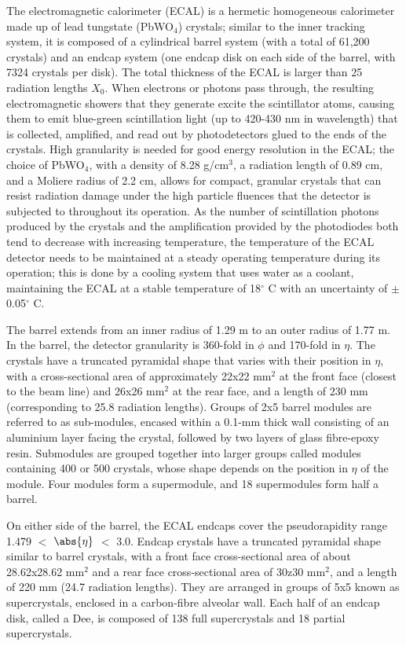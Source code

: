 The electromagnetic calorimeter (ECAL) is a hermetic homogeneous calorimeter made up of lead tungstate (PbWO$_4$) crystals; similar to the inner tracking system, it is composed of a cylindrical barrel system (with a total of 61,200 crystals) and an endcap system (one endcap disk on each side of the barrel, with 7324 crystals per disk). The total thickness of the ECAL is larger than 25 radiation lengths $X_0$. When electrons or photons pass through, the resulting electromagnetic showers that they generate excite the scintillator atoms, causing them to emit blue-green scintillation light (up to 420-430 nm in wavelength) that is collected, amplified, and read out by photodetectors glued to the ends of the crystals. High granularity is needed for good energy resolution in the ECAL; the choice of PbWO$_4$, with a density of 8.28 g/cm$^3$, a radiation length of 0.89 cm, and a Moliere radius of 2.2 cm, allows for compact, granular crystals that can resist radiation damage under the high particle fluences that the detector is subjected to throughout its operation. As the number of scintillation photons produced by the crystals and the amplification provided by the photodiodes both tend to decrease with increasing temperature, the temperature of the ECAL detector needs to be maintained at a steady operating temperature during its operation; this is done by a cooling system that uses water as a coolant, maintaining the ECAL at a stable temperature of 18$^{\circ}$ C with an uncertainty of $\pm$0.05$^{\circ}$ C.

The barrel extends from an inner radius of 1.29 m to an outer radius of 1.77 m. In the barrel, the detector granularity is 360-fold in $\phi$ and 170-fold in $\eta$. The crystals have a truncated pyramidal shape that varies with their position in $\eta$, with a cross-sectional area of approximately 22x22 mm$^2$ at the front face (closest to the beam line) and 26x26 mm$^2$ at the rear face, and a length of 230 mm (corresponding to 25.8 radiation lengths). Groups of 2x5 barrel modules are referred to as sub-modules, encased within a 0.1-mm thick wall consisting of an aluminium layer facing the crystal, followed by two layers of glass fibre-epoxy resin. Submodules are grouped together into larger groups called modules containing 400 or 500 crystals, whose shape depends on the position in $\eta$ of the module. Four modules form a supermodule, and 18 supermodules form half a barrel.

On either side of the barrel, the ECAL endcaps cover the pseudorapidity range 1.479 $<$ $\abs{\eta}$ $<$ 3.0. Endcap crystals have a truncated pyramidal shape similar to barrel crystals, with a front face cross-sectional area of about 28.62x28.62 mm$^2$ and a rear face cross-sectional area of 30z30 mm$^2$, and a length of 220 mm (24.7 radiation lengths). They are arranged in groups of 5x5 known as supercrystals, enclosed in a carbon-fibre alveolar wall. Each half of an endcap disk, called a Dee, is composed of 138 full supercrystals and 18 partial supercrystals.

